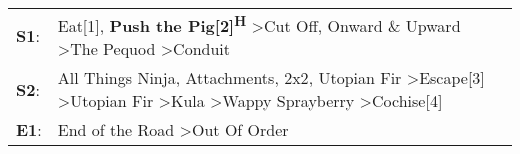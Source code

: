 \begin{supertabular}{p{0.03\textwidth}p{0.92\textwidth}}
 \textbf{S1}:  &                                                                                                                                     Eat[1]\textsuperscript{}, \enspace \textbf{Push the Pig[2]\textsuperscript{H}} \textgreater \enspace Cut Off\textsuperscript{}, \enspace Onward \& Upward\textsuperscript{} \textgreater \enspace The Pequod\textsuperscript{} \textgreater \enspace Conduit\textsuperscript{}  \enspace  \\
 \textbf{S2}:  &  All Things Ninja\textsuperscript{}, \enspace Attachments\textsuperscript{}, \enspace 2x2\textsuperscript{}, \enspace Utopian Fir\textsuperscript{} \textgreater \enspace Escape[3]\textsuperscript{} \textgreater \enspace Utopian Fir\textsuperscript{} \textgreater \enspace Kula\textsuperscript{} \textgreater \enspace Wappy Sprayberry\textsuperscript{} \textgreater \enspace Cochise[4]\textsuperscript{}  \enspace  \\
 \textbf{E1}:  &                                                                                                                                                                                                                                                                                                                             End of the Road\textsuperscript{} \textgreater \enspace Out Of Order\textsuperscript{}  \enspace  \\
\end{supertabular}

